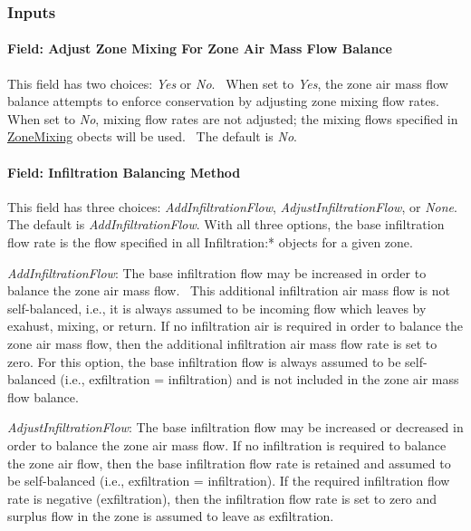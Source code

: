 \subsubsection{Inputs}\label{inputs-9-002}

\paragraph{Field: Adjust Zone Mixing For Zone Air Mass Flow Balance}\label{field-adjust-zone-mixing-for-zone-air-mass-flow-balance}

This field has two choices: \emph{Yes} or \emph{No}.~ When set to \emph{Yes}, the zone air mass flow balance attempts to enforce conservation by adjusting zone mixing flow rates. When set to \emph{No}, mixing flow rates are not adjusted; the mixing flows specified in \hyperref[zonemixing]{ZoneMixing} obects will be used.~ The default is \emph{No}.

\paragraph{Field: Infiltration Balancing Method}\label{field-infiltration-balancing-method}

This field has three choices: \emph{AddInfiltrationFlow}, \emph{AdjustInfiltrationFlow}, or \emph{None}. The default is \emph{AddInfiltrationFlow}. With all three options, the base infiltration flow rate is the flow specified in all Infiltration:* objects for a given zone.

\emph{AddInfiltrationFlow}: The base infiltration flow may be increased in order to balance the zone air mass flow.~ This additional infiltration air mass flow is not self-balanced, i.e., it is always assumed to be incoming flow which leaves by exahust, mixing, or return. If no infiltration air is required in order to balance the zone air mass flow, then the additional infiltration air mass flow rate is set to zero. For this option, the base infiltration flow is always assumed to be self-balanced (i.e., exfiltration = infiltration) and is not included in the zone air mass flow balance.

\emph{AdjustInfiltrationFlow}: The base infiltration flow may be increased or decreased in order to balance the zone air mass flow. If no infiltration is required to balance the zone air flow, then the base infiltration flow rate is retained and assumed to be self-balanced (i.e., exfiltration = infiltration). If the required infiltration flow rate is negative (exfiltration), then the infiltration flow rate is set to zero and surplus flow in the zone is assumed to leave as exfiltration.

